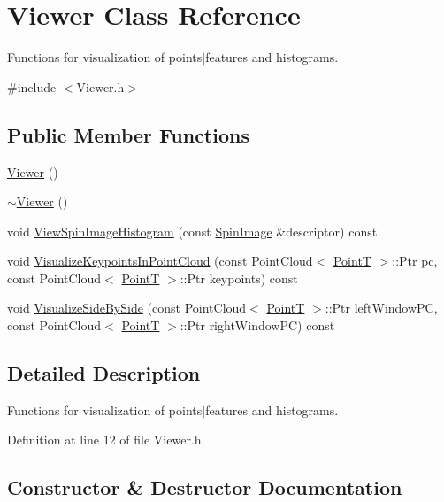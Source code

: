 \hypertarget{class_viewer}{}\section{Viewer Class Reference}
\label{class_viewer}


Functions for visualization of points$\vert$features and histograms.  




{\ttfamily \#include $<$Viewer.\+h$>$}

\subsection*{Public Member Functions}
\begin{DoxyCompactItemize}
\item 
\hyperlink{class_viewer_aaedebacb31cba87de6e7d448ed8d6586}{Viewer} ()
\item 
\hyperlink{class_viewer_a324e5a6a1532fe5eac3f3b0e4792b2da}{$\sim$\+Viewer} ()
\item 
void \hyperlink{class_viewer_af5b5d29371cad5439cffbc1e242ecfcd}{View\+Spin\+Image\+Histogram} (const \hyperlink{include_8h_ab79ade12a22a8e5e2864650f820e9c6f}{Spin\+Image} \&descriptor) const
\item 
void \hyperlink{class_viewer_add8f4dde235531d689e0bf6e70689414}{Visualize\+Keypoints\+In\+Point\+Cloud} (const Point\+Cloud$<$ \hyperlink{include_8h_a6ca7710b84e9152e036423253ffc1ae7}{PointT} $>$\+::Ptr pc, const Point\+Cloud$<$ \hyperlink{include_8h_a6ca7710b84e9152e036423253ffc1ae7}{PointT} $>$\+::Ptr keypoints) const
\item 
void \hyperlink{class_viewer_a1c2fe687ac2ce3f920caecae92a44482}{Visualize\+Side\+By\+Side} (const Point\+Cloud$<$ \hyperlink{include_8h_a6ca7710b84e9152e036423253ffc1ae7}{PointT} $>$\+::Ptr left\+Window\+PC, const Point\+Cloud$<$ \hyperlink{include_8h_a6ca7710b84e9152e036423253ffc1ae7}{PointT} $>$\+::Ptr right\+Window\+PC) const
\end{DoxyCompactItemize}


\subsection{Detailed Description}
Functions for visualization of points$\vert$features and histograms. 

Definition at line 12 of file Viewer.\+h.



\subsection{Constructor \& Destructor Documentation}
\mbox{\label{class_viewer_aaedebacb31cba87de6e7d448ed8d6586}} 
